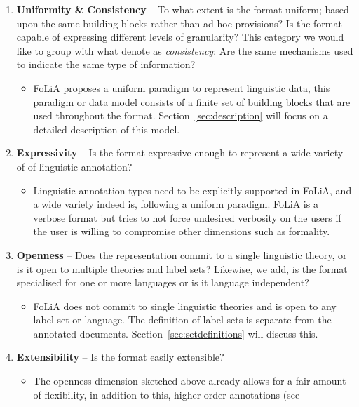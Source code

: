 \documentclass[a4paper,10pt,twoside]{article}
\begin{document}
\begin{enumerate}
\item \textbf{Uniformity \& Consistency} -- To what extent is the format
  uniform; based upon the same building blocks rather than ad-hoc provisions?
  Is the format capable of expressing different levels of granularity? This
  category we would like to group with what  denote as
  \emph{consistency}: Are the same mechanisms used to indicate the same type of
  information?
  \begin{itemize}
    \item[] FoLiA proposes a uniform paradigm to represent linguistic data, this
      paradigm or data model consists of a finite set of building blocks that
      are used throughout the format. Section~\ref{sec:description} will focus
      on a detailed description of this model.
  \end{itemize}
\item \textbf{Expressivity} -- Is the format expressive enough to represent a
  wide variety of of linguistic annotation?
  \begin{itemize}
    \item[] Linguistic annotation types need to be explicitly supported in FoLiA,
      and a wide variety indeed is, following a uniform paradigm. FoLiA is a
      verbose format but tries to not force undesired verbosity on the users
      if the user is willing to compromise other dimensions such as formality.
  \end{itemize}
\item \textbf{Openness} -- Does the representation commit to a single linguistic
  theory, or is it open to multiple theories and label sets? Likewise, we add,
  is the format specialised for one or more languages or is it language
  independent?
  \begin{itemize}
    \item[] FoLiA does not commit to single linguistic theories and is open to
      any label set or language. The definition of label sets is separate from
      the annotated documents. Section~\ref{sec:setdefinitions} will discuss
      this.
  \end{itemize}
\item \textbf{Extensibility} -- Is the format easily extensible?
  \begin{itemize}
    \item[] The openness dimension sketched above already allows for a fair
      amount of flexibility, in addition to this, higher-order annotations (see

\end{itemize}
\end{enumerate}
\end{document}
